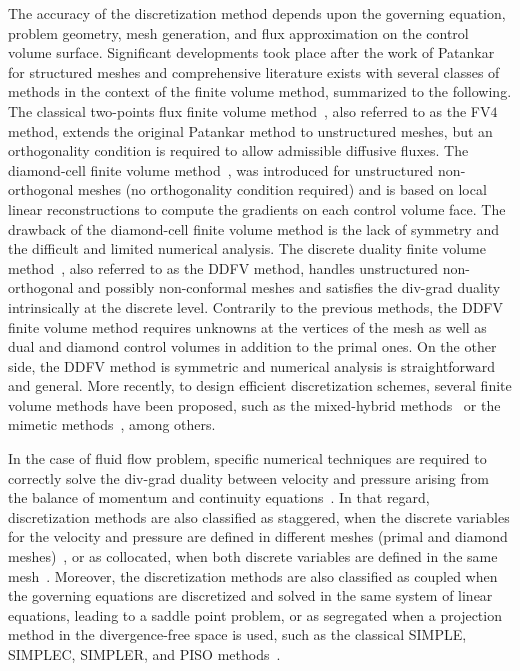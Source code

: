 The accuracy of the discretization method depends upon the governing equation, problem geometry, mesh generation, and flux approximation on the control volume surface.
Significant developments took place after the work of Patankar for structured meshes and comprehensive literature exists with several classes of methods in the context of the finite volume method, summarized to the following.
The classical two-points flux finite volume method~\cite{chap1:1991caia,chap1:1991caib,chap1:2000eymard,chap1:2001eymard}, also referred to as the FV$4$ method, extends the original Patankar method to unstructured meshes, but an orthogonality condition is required to allow admissible diffusive fluxes.
The diamond-cell finite volume method~\cite{chap1:1999coudierea,chap1:1999coudiereb,chap1:2008manzini}, was introduced for unstructured non-orthogonal meshes (no orthogonality condition required) and is based on local linear reconstructions to compute the gradients on each control volume face.
The drawback of the diamond-cell finite volume method is the lack of symmetry and the difficult and limited numerical analysis.
The discrete duality finite volume method~\cite{chap1:2000hermeline,chap1:2005domelevo,chap1:2010coudiere}, also referred to as the DDFV method, handles unstructured non-orthogonal and possibly non-conformal meshes and satisfies the div-grad duality intrinsically at the discrete level.
Contrarily to the previous methods, the DDFV finite volume method requires unknowns at the vertices of the mesh as well as dual and diamond control volumes in addition to the primal ones.
On the other side, the DDFV method is symmetric and numerical analysis is straightforward and general.
More recently, to design efficient discretization schemes, several finite volume methods have been proposed, such as the mixed-hybrid methods~\cite{chap1:2006droniou,chap1:2008eymard} or the mimetic methods~\cite{chap1:2005brezzi,chap1:2008cangiani}, among others.

In the case of fluid flow problem, specific numerical techniques are required to correctly solve the div-grad duality between velocity and pressure arising from the balance of momentum and continuity equations~\cite{chap1:1967chorin,chap1:1996ferziger,chap1:1983pironneau,chap1:1984crochet,chap1:1985peyret,chap1:1987temam,chap1:2014zienkiewicz}.
In that regard, discretization methods are also classified as staggered, when the discrete variables for the velocity and pressure are defined in different meshes (primal and diamond meshes)~\cite{chap1:2004piller,chap1:2004vidovic,chap1:2006kampanis}, or as collocated, when both discrete variables are defined in the same mesh~\cite{chap1:1998oliveira,chap1:2009eymard,chap1:2014shang}.
Moreover, the discretization methods are also classified as coupled when the governing equations are discretized and solved in the same system of linear equations, leading to a saddle point problem, or as segregated when a projection method in the divergence-free space is used, such as the classical SIMPLE, SIMPLEC, SIMPLER, and PISO methods~\cite{chap1:2001brown,chap1:2006guermont,chap1:2009gao,chap1:2009griffith}.

